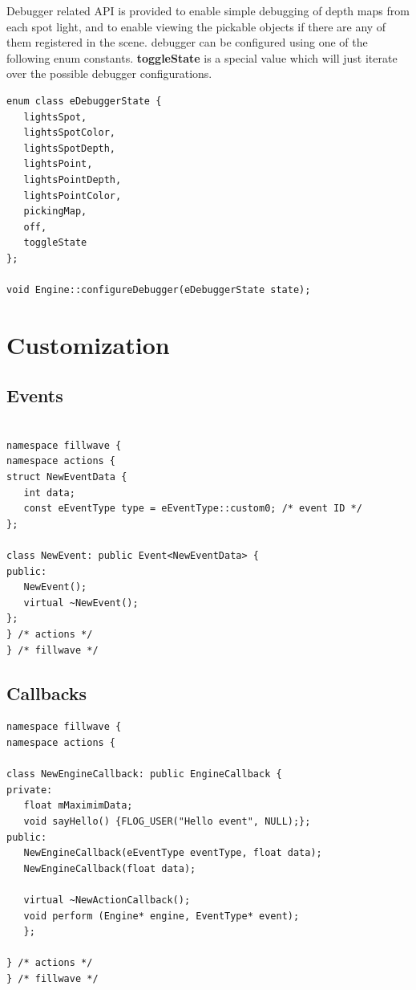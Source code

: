 \documentclass{article}
\begin{document}
\indent \indent Debugger related API is provided to enable simple debugging of depth maps from each spot light, and to enable viewing the pickable objects if there are any of them registered in the scene. debugger can be configured using one of the following enum constants. \textbf{toggleState} is a special value which will just iterate over the possible debugger configurations.

\begin{lstlisting}
enum class eDebuggerState {
   lightsSpot,
   lightsSpotColor,
   lightsSpotDepth,
   lightsPoint,
   lightsPointDepth,
   lightsPointColor,
   pickingMap,
   off,
   toggleState
};

void Engine::configureDebugger(eDebuggerState state);
\end{lstlisting}

\newpage

\section{Customization}

\subsection{Events}\label{sec:Custom events}
\begin{lstlisting}

namespace fillwave {
namespace actions {
struct NewEventData {
   int data;
   const eEventType type = eEventType::custom0; /* event ID */
};

class NewEvent: public Event<NewEventData> {
public:
   NewEvent();
   virtual ~NewEvent();
};
} /* actions */
} /* fillwave */
\end{lstlisting}
\subsection{Callbacks}\label{sec:Custom callbacks}
\begin{lstlisting}
namespace fillwave {
namespace actions {

class NewEngineCallback: public EngineCallback {
private:
   float mMaximimData;
   void sayHello() {FLOG_USER("Hello event", NULL);};
public:
   NewEngineCallback(eEventType eventType, float data);
   NewEngineCallback(float data);

   virtual ~NewActionCallback();
   void perform (Engine* engine, EventType* event);
   };

} /* actions */
} /* fillwave */
\end{lstlisting}
\end{document}
